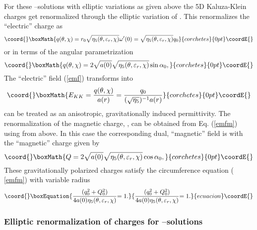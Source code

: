 \documentclass[a4paper,preprint,prabib,aps]{revtex4}
\begin{document}
For these \myHighlight{$\chi $}\coordHE{}--solutions with elliptic variations as given above the 5D
Kaluza-Klein charges get renormalized through the elliptic variation of \coordHE{}. This renormalizes the
``electric'' charge as
\[\coord{}\boxMath{
q(\theta ,\chi )=r_0\sqrt{\eta _5(\theta ,\varepsilon _r,\chi )}\omega
^{\prime }(0)=\sqrt{\eta _5(\theta ,\varepsilon _r,\chi )}q_0
}{corchetes}{0pt}\coordE{}\]
or in terms of the angular parametrization
\[\coord{}\boxMath{
q(\theta ,\chi )=2\sqrt{a(0)}\sqrt{\eta _5(\theta ,\varepsilon _r,\chi )}
\sin \alpha _0 ,
}{corchetes}{0pt}\coordE{}\]
The ``electric'' field (\ref{emf}) transforms into
\[\coord{}\boxMath{
E_{KK}=\frac{q(\theta ,\chi )}{a(r)}=\frac{q_0}{(\sqrt{\eta _5})^{-1}a(r)}
}{corchetes}{0pt}\coordE{}\]
\coordHE{} can be treated as an anisotropic, gravitationally
induced permittivity. The renormalization of the magnetic charge, \coordHE{}, can be obtained from Eq. (\ref{emfm})
using \coordHE{} from above. In this case the corresponding dual,
``magnetic'' field is \coordHE{} with the ``magnetic''
charge \coordHE{} given by
\[\coord{}\boxMath{
Q=2\sqrt{a(0)}\sqrt{\eta _5(\theta ,\varepsilon _r,\chi )}\cos \alpha _0,
}{corchetes}{0pt}\coordE{}\]
These gravitationally polarized charges satisfy the circumference equation (%
\ref{emfm}) with variable radius \coordHE{}
\begin{equation}\coord{}\boxEquation{
\frac{(q_0^2+Q_0^2)}{4a(0)\eta _5(\theta ,\varepsilon _r,\chi )}{=1.}
\label{emfm1}
}{
\frac{(q_0^2+Q_0^2)}{4a(0)\eta _5(\theta ,\varepsilon _r,\chi )}{=1.}
}{ecuacion}\coordE{}\end{equation}

\subsubsection{Elliptic renormalization of charges for \myHighlight{$\protect\varphi$}\coordHE{}%
--solutions}
\end{document}
